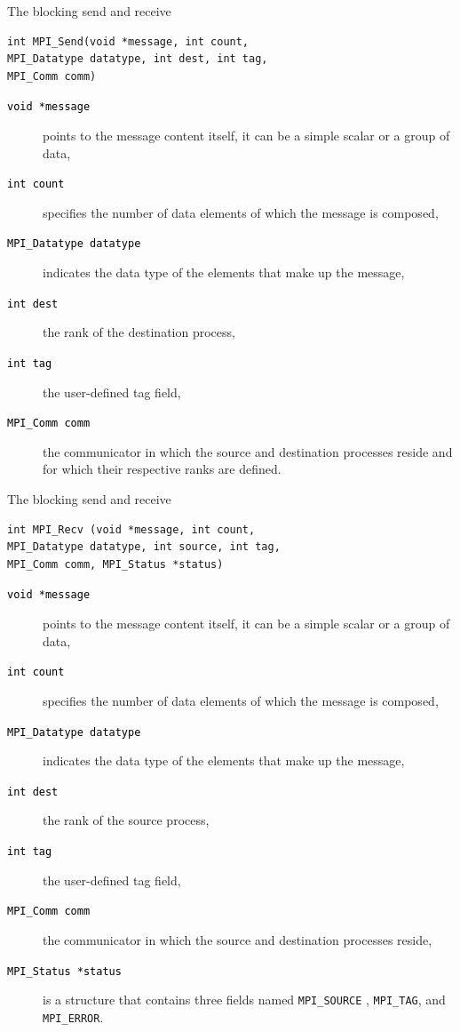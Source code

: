 \documentclass[xcolor={svgnames,usenames}]{beamer}
\begin{document}
\begin{frame}[fragile]{The blocking send and receive}
\begin{verbatim}
int MPI_Send(void *message, int count, 
MPI_Datatype datatype, int dest, int tag, 
MPI_Comm comm)
\end{verbatim}
\begin{description}
\item[\textcolor{black}{\texttt{void *message}}] points to the message content itself, it can be a simple scalar or a group of data,
\item[\textcolor{black}{\texttt{int count}}] specifies the number of data elements of which the message is composed,
\item[\textcolor{black}{\texttt{MPI_Datatype datatype}}] indicates the \alert{data type} of the elements that make up the message,
\item[\textcolor{black}{\texttt{int dest}}] the rank of the destination process, 
\item[\textcolor{black}{\texttt{int tag}}] the user-defined tag field, 
\item[\textcolor{black}{\texttt{MPI_Comm comm}}] the communicator in which the source and destination processes reside and for which their respective
ranks are defined.
\end{description}
\end{frame}

\begin{frame}[fragile]{The blocking send and receive}
\begin{verbatim}
int MPI_Recv (void *message, int count, 
MPI_Datatype datatype, int source, int tag,
MPI_Comm comm, MPI_Status *status)
\end{verbatim}
\begin{description}
\item[\textcolor{black}{\texttt{void *message}}] points to the message content itself, it can be a simple scalar or a group of data,
\item[\textcolor{black}{\texttt{int count}}] specifies the number of data elements of which the message is composed,
\item[\textcolor{black}{\texttt{MPI_Datatype datatype}}] indicates the \alert{data type} of the elements that make up the message,
\item[\textcolor{black}{\texttt{int dest}}] the rank of the source process, 
\item[\textcolor{black}{\texttt{int tag}}] the user-defined tag field, 
\item[\textcolor{black}{\texttt{MPI_Comm comm}}] the communicator in which the source and destination processes reside,
\item[\textcolor{black}{\texttt{MPI_Status *status}}] is a structure that contains three fields named \texttt{MPI_SOURCE} , \texttt{MPI_TAG}, and \texttt{MPI_ERROR}.
\end{description}
\end{frame}
\end{document}
